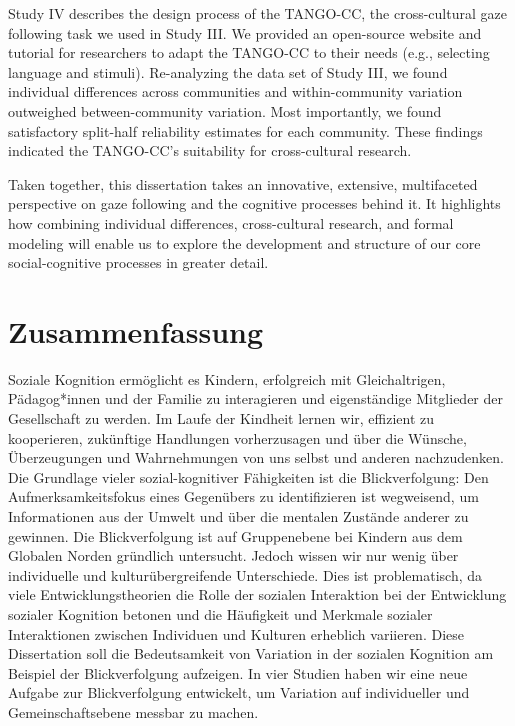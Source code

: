 \documentclass[
]{scrbook}
\begin{document}
Study IV describes the design process of the TANGO-CC, the cross-cultural gaze following task we used in Study III. We provided an open-source website and tutorial for researchers to adapt the TANGO-CC to their needs (e.g., selecting language and stimuli). Re-analyzing the data set of Study III, we found individual differences across communities and within-community variation outweighed between-community variation. Most importantly, we found satisfactory split-half reliability estimates for each community. These findings indicated the TANGO-CC's suitability for cross-cultural research.

Taken together, this dissertation takes an innovative, extensive, multifaceted perspective on gaze following and the cognitive processes behind it. It highlights how combining individual differences, cross-cultural research, and formal modeling will enable us to explore the development and structure of our core social-cognitive processes in greater detail.

\chapter{Zusammenfassung}\label{zusammenfassung}

Soziale Kognition ermöglicht es Kindern, erfolgreich mit Gleichaltrigen, Pädagog*innen und der Familie zu interagieren und eigenständige Mitglieder der Gesellschaft zu werden. Im Laufe der Kindheit lernen wir, effizient zu kooperieren, zukünftige Handlungen vorherzusagen und über die Wünsche, Überzeugungen und Wahrnehmungen von uns selbst und anderen nachzudenken. Die Grundlage vieler sozial-kognitiver Fähigkeiten ist die Blickverfolgung: Den Aufmerksamkeitsfokus eines Gegenübers zu identifizieren ist wegweisend, um Informationen aus der Umwelt und über die mentalen Zustände anderer zu gewinnen. Die Blickverfolgung ist auf Gruppenebene bei Kindern aus dem Globalen Norden gründlich untersucht. Jedoch wissen wir nur wenig über individuelle und kulturübergreifende Unterschiede. Dies ist problematisch, da viele Entwicklungstheorien die Rolle der sozialen Interaktion bei der Entwicklung sozialer Kognition betonen und die Häufigkeit und Merkmale sozialer Interaktionen zwischen Individuen und Kulturen erheblich variieren. Diese Dissertation soll die Bedeutsamkeit von Variation in der sozialen Kognition am Beispiel der Blickverfolgung aufzeigen. In vier Studien haben wir eine neue Aufgabe zur Blickverfolgung entwickelt, um Variation auf individueller und Gemeinschaftsebene messbar zu machen.
\end{document}
